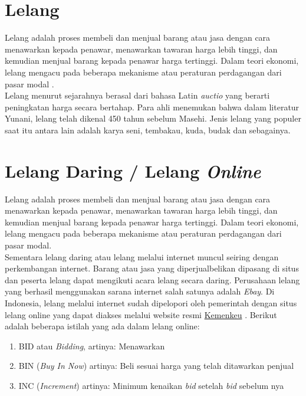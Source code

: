 	\section{  Lelang}
	Lelang adalah proses membeli dan menjual barang atau jasa dengan cara menawarkan kepada penawar, menawarkan tawaran harga lebih tinggi, dan kemudian menjual barang kepada penawar harga tertinggi. Dalam teori ekonomi, lelang mengacu pada beberapa mekanisme atau peraturan perdagangan dari pasar modal \cite{balailelang_sejarah_nodate}.
	\\ \indent
	Lelang menurut sejarahnya berasal dari bahasa Latin \textit{auctio} yang berarti peningkatan harga secara bertahap. Para ahli menemukan bahwa dalam literatur Yunani, lelang telah dikenal 450 tahun sebelum Masehi. Jenis lelang yang populer saat itu antara lain adalah karya seni, tembakau, kuda, budak dan sebagainya\cite{pratama_lelang_2012}.
	   
	\section{  Lelang Daring / Lelang \textit{Online}}
	Lelang adalah proses membeli dan menjual barang atau jasa dengan cara menawarkan kepada penawar, menawarkan tawaran harga lebih tinggi, dan kemudian menjual barang kepada penawar harga tertinggi. Dalam teori ekonomi, lelang mengacu pada beberapa mekanisme atau peraturan perdagangan dari pasar modal. \\
	Sementara lelang daring atau lelang melalui internet muncul seiring dengan perkembangan internet. Barang atau jasa yang diperjualbelikan dipasang di situs dan peserta lelang dapat mengikuti acara lelang secara daring. Perusahaan lelang yang berhasil menggunakan sarana internet salah satunya adalah \textit{Ebay}. Di Indonesia, lelang melalui internet sudah dipelopori oleh pemerintah dengan situs lelang online yang dapat diakses melalui website resmi \href{https://www.lelangdjkn.kemenkeu.go.id}{Kemenkeu} \cite{wikipedia_lelang_2016}. 
	Berikut adalah beberapa istilah yang ada dalam lelang online:
	\begin{enumerate}
	      	\item BID atau \textit{Bidding}, artinya: Menawarkan
	      	\item BIN (\textit{Buy In Now}) artinya: Beli sesuai harga yang telah ditawarkan penjual
	      	\item INC (\textit{Increment}) artinya: Minimum kenaikan \textit{bid} setelah \textit{bid} sebelum nya \cite{noauthor_arti_nodate}
	\end{enumerate}

